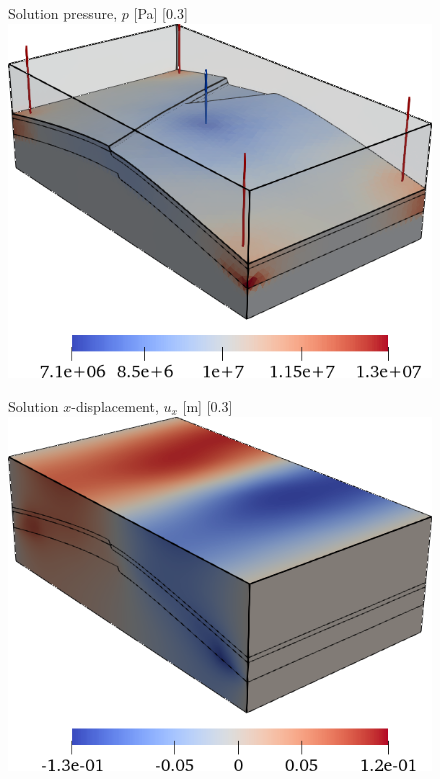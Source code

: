 \begin{figure} [htbp]
    \hfill
    \subcaptionbox
    {
        Solution pressure, $p$ [\unit{Pa}]
        \label{fig:mazumodel2_geosx_sol_p}
    }
    [0.3\textwidth]
    {
        \includegraphics[width=\linewidth]{figs/MazuModel2/geosx/poro_sol_p}
    }
    \par\bigskip
    \subcaptionbox
    {
        Solution $x$-displacement, $u_x$ [\unit{m}]
        \label{fig:mazumodel2_geosx_sol_x}
    }
    [0.3\textwidth]
    {
        \includegraphics[width=\linewidth]{figs/MazuModel2/geosx/poro_sol_x}
    }
    \hfill
    \subcaptionbox

\end{figure}
